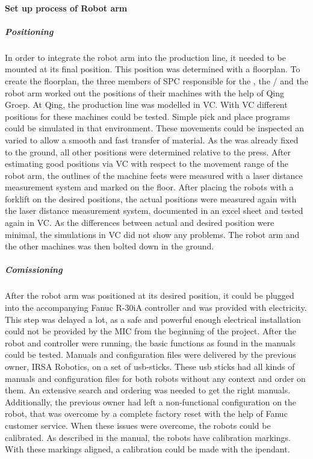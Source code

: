 \paragraph{Set up process of Robot arm}

\subparagraph{Positioning}
In order to integrate the robot arm into the production line, it needed to be mounted at its final position. This position was determined with a floorplan. To create the floorplan, the three members of SPC responsible for the , the / and the robot arm worked out the positions of their machines with the help of Qing Groep. At Qing, the production line was modelled in \ac{VC}. With \ac{VC} different positions for these machines could be tested. 
Simple pick and place programs could be simulated in that environment.
These movements could be inspected an varied to allow a smooth and fast transfer of material.
As the  was already fixed to the ground, all other positions were determined relative to the press.
After estimating good positions via \ac{VC} with respect to the movement range of the robot arm, the outlines of the machine feets were measured with a laser distance measurement system and marked on the floor.
After placing the robots with a forklift on the desired positions, the actual positions were measured again with the laser distance measurement system, documented in an excel sheet and tested again in VC. 
As the differences between actual and desired position were minimal, the simulations in VC did not show any problems.
The robot arm and the other machines was then bolted down in the ground. 

\subparagraph{Comissioning}
After the robot arm was positioned at its desired position, it could be plugged into the accompanying Fanuc R-30iA controller and was provided with electricity. 
This step was delayed a lot, as a safe and powerful enough electrical installation could not be provided by the \ac{MIC} from the beginning of the project.
After the robot and controller were running, the basic functions as found in the manuals could be tested. 
Manuals and configuration files were delivered by the previous owner, IRSA Robotics, on a set of \ac{usb}-sticks. 
These \ac{usb} sticks had all kinds of manuals and configuration files for both robots without any context and order on them. 
An extensive search and ordering was needed to get the right manuals.
Additionally, the previous owner had left a non-functional configuration on the robot, that was overcome by a complete factory reset with the help of Fanuc customer service.
When these issues were overcome, the robots could be calibrated. As described in the manual, the robots have calibration markings. With these markings aligned, a calibration could be made with the \gls{ipendant}.




